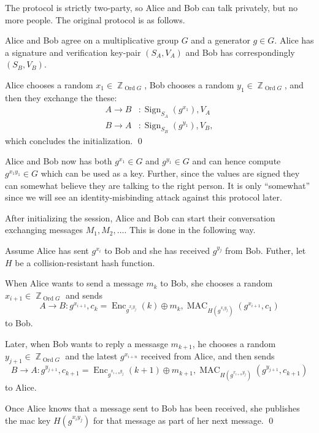 \documentclass[draft]{llncs}
\DeclareMathOperator{\sign}{\mathrm{Sign}}
\DeclareMathOperator{\enc}{\mathrm{Enc}}
\DeclareMathOperator{\mac}{\mathrm{MAC}}
\DeclareMathOperator{\ord}{Ord}
\DeclareMathOperator{\Z}{\mathbb Z}
\begin{document}
The protocol is strictly two-party, so Alice and Bob can talk privately, but no 
more people.
The original protocol \cite{otr2004} is as follows.

\begin{protocol}\label{proto:otr1init}
  Alice and Bob agree on a multiplicative group \(G\) and a generator \(g\in 
  G\).
  Alice has a signature and verification key-pair \((S_A, V_A)\) and Bob has 
  correspondingly \((S_B, V_B)\).

  Alice chooses a random \(x_1\in \Z_{\ord G}\),
  Bob chooses a random \(y_1\in \Z_{\ord G}\),
  and then they exchange the these:
  \begin{align*}
    A\to B&\colon \sign_{S_A}( g^{x_1} ), V_A \\
    B\to A&\colon \sign_{S_B}( g^{y_1} ), V_B,
  \end{align*}
  which concludes the initialization.
  \qed
\end{protocol}

Alice and Bob now has both \(g^{x_1}\in G\) and \(g^{y_1}\in G\) and can hence 
compute \(g^{x_1 y_1}\in G\) which can be used as a key.
Further, since the values are signed they can somewhat believe they are talking 
to the right person.
It is only \enquote{somewhat} since we will see an identity-misbinding attack 
against this protocol later.

After initializing the session, Alice and Bob can start their conversation 
exchanging messages \(M_1, M_2, \ldots\).
This is done in the following way.

\begin{protocol}\label{proto:otr1comm}
  Assume Alice has sent \(g^{x_i}\) to Bob and she has received \(g^{y_j}\) 
  from Bob.
  Futher, let \(H\) be a collision-resistant hash function.

  When Alice wants to send a message \(m_k\) to Bob, she chooses a random 
  \(x_{i+1}\in\Z_{\ord G}\) and sends
  \begin{equation*}
    A\to B\colon g^{x_{i+1}},
      c_k = \enc_{g^{x_i y_j}}( k )\oplus m_k,
      \mac_{H( g^{x_i y_j} )}( g^{x_{i+1}}, c_1 )
  \end{equation*}
  to Bob.

  Later, when Bob wants to reply a messasge \(m_{k+1}\), he chooses a random 
  \(y_{j+1}\in\Z_{\ord G}\) and the latest \(g^{x_{i+n}}\) received from Alice, 
  and then sends
  \begin{equation*}
    B\to A\colon g^{y_{j+1}},
    c_{k+1} = \enc_{g^{x_{i+n} y_j}}( k+1 )\oplus m_{k+1},
    \mac_{H( g^{x_{i+n} y_j} )}( g^{y_{j+1}}, c_{k+1} )
  \end{equation*}
  to Alice.

  Once Alice knows that a message sent to Bob has been received, she publishes 
  the \ac{mac} key \( H( g^{x_i y_j} ) \) for that message as part of her next 
  message.
  \qed
\end{protocol}
\end{document}
